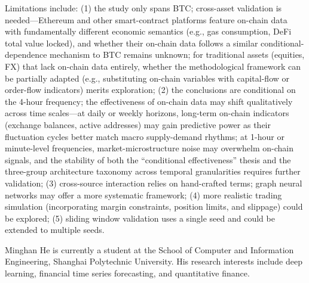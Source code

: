 \documentclass[a4paper]{cas-dc}
\begin{document}
Limitations include: (1) the study only spans BTC; cross-asset validation is needed---Ethereum and other smart-contract platforms feature on-chain data with fundamentally different economic semantics (e.g., gas consumption, DeFi total value locked), and whether their on-chain data follows a similar conditional-dependence mechanism to BTC remains unknown; for traditional assets (equities, FX) that lack on-chain data entirely, whether the methodological framework can be partially adapted (e.g., substituting on-chain variables with capital-flow or order-flow indicators) merits exploration; (2) the conclusions are conditional on the 4-hour frequency; the effectiveness of on-chain data may shift qualitatively across time scales---at daily or weekly horizons, long-term on-chain indicators (exchange balances, active addresses) may gain predictive power as their fluctuation cycles better match macro supply-demand rhythms; at 1-hour or minute-level frequencies, market-microstructure noise may overwhelm on-chain signals, and the stability of both the ``conditional effectiveness'' thesis and the three-group architecture taxonomy across temporal granularities requires further validation; (3) cross-source interaction relies on hand-crafted terms; graph neural networks may offer a more systematic framework; (4) more realistic trading simulation (incorporating margin constraints, position limits, and slippage) could be explored; (5) sliding window validation uses a single seed and could be extended to multiple seeds.




\printcredits




\bio{}
Minghan He is currently a student at the School of Computer and Information Engineering, Shanghai Polytechnic University. His research interests include deep learning, financial time series forecasting, and quantitative finance.
\endbio
\end{document}

